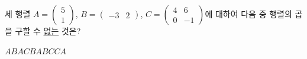 \hspace*{2mm}\begin{minipage}[t]{\dimexpr\linewidth-2mm\relax}\vspace{0pt}
세 행렬 $A=\begin{pmatrix} 5 \\ 1 \end{pmatrix}$, $B=\begin{pmatrix} -3 & 2 \end{pmatrix}$, $C=\begin{pmatrix} 4 & 6 \\ 0 & -1 \end{pmatrix}$에 대하여 다음 중 행렬의 곱을 구할 수 \underline{없는} 것은?
\begin{choices32}{$AB$}{$AC$}{$BA$}{$BC$}{$CA$}\end{choices32}\end{minipage}
